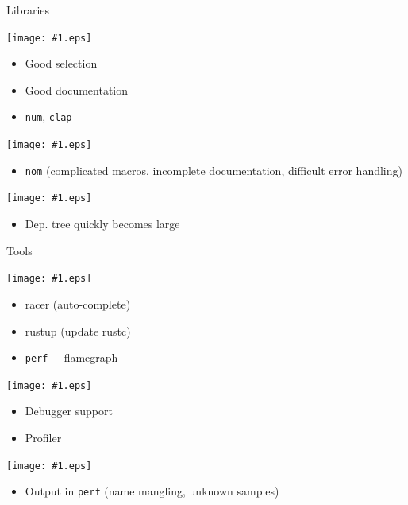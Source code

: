 \documentclass{beamer}
\renewcommand\big[1]{
  \begin{center}
    \Huge{#1}
  \end{center}
}
\def\MinipageWidth{.32\textwidth}
\newcommand\SmileyBlock[2]{
  \begin{minipage}[t]{\MinipageWidth}
    \begin{center}
      \texttt{[image: \#1.eps]}
    \end{center}
    \scriptsize
    #2
  \end{minipage}
}
\begin{document}
\begin{frame}[t,fragile]
  \big{Libraries}\pause

  \SmileyBlock{good}{
    \begin{itemize}
      \item Good selection
      \item Good documentation
      \item \texttt{num}, \texttt{clap}
    \end{itemize}
  }\pause
  \SmileyBlock{bad}{
    \begin{itemize}
      \item \texttt{nom} (complicated macros, incomplete
      documentation, difficult error handling)
    \end{itemize}
  }\pause
  \SmileyBlock{ugly}{
    \begin{itemize}
      \item Dep. tree quickly becomes large
    \end{itemize}
  }
\end{frame}

\begin{frame}[t,fragile]
  \big{Tools}\pause

  \SmileyBlock{good}{
    \begin{itemize}
      \item racer (auto-complete)
      \item rustup (update rustc)
      \item \texttt{perf} + flamegraph
    \end{itemize}
  }\pause
  \SmileyBlock{bad}{
    \begin{itemize}
      \item Debugger support
      \item Profiler
    \end{itemize}
  }\pause
  \SmileyBlock{ugly}{
    \begin{itemize}
      \item Output in \texttt{perf} (name mangling, unknown samples)
    \end{itemize}
  }
\end{frame}
\end{document}

